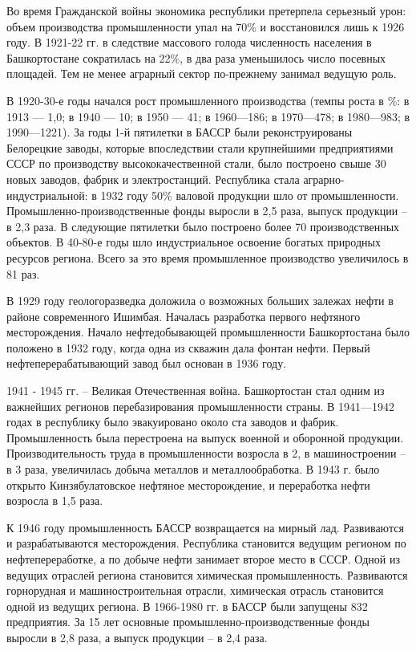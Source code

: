 Во время Гражданской войны экономика республики претерпела серьезный урон: объем производства промышленности упал на 70\% и восстановился лишь к 1926 году. В 1921-22 гг. в следствие массового голода численность населения в Башкортостане сократилась на 22\%, в два раза уменьшилось число посевных площадей. Тем не менее аграрный сектор по-прежнему занимал ведущую роль. 

В 1920-30-е годы начался рост промышленного производства (темпы роста в \%: в 1913 — 1,0; в 1940 — 10; в 1950 — 41; в 1960—186; в 1970—478; в 1980—983; в 1990—1221). За годы 1-й пятилетки в БАССР были реконструированы Белорецкие заводы, которые впоследствии стали крупнейшими предприятиями СССР по производству высококачественной стали, было построено свыше 30 новых заводов, фабрик и электростанций. Республика стала аграрно-индустриальной: в 1932 году 50\% валовой продукции шло от промышленности. Промышленно-производственные фонды выросли в 2,5 раза, выпуск продукции – в 2,3 раза. В следующие пятилетки было построено более 70 производственных объектов. В 40-80-е годы шло индустриальное освоение богатых природных ресурсов региона. Всего за это время промышленное производство увеличилось в 81 раз.

В 1929 году геологоразведка доложила о возможных больших залежах нефти в районе современного Ишимбая. Началась разработка первого нефтяного месторождения. Начало нефтедобывающей промышленности Башкортостана было положено в 1932 году,  когда одна из скважин дала фонтан нефти. Первый нефтеперерабатывающий завод был основан в 1936 году.

1941 - 1945 гг. – Великая Отечественная война. Башкортостан стал одним из важнейших регионов перебазирования промышленности страны. В 1941—1942 годах в республику было эвакуировано около ста заводов и фабрик. Промышленность была перестроена на выпуск военной и оборонной продукции. Производительность труда в промышленности возросла в 2, в машиностроении – в 3 раза, увеличилась добыча металлов и металлообработка. В 1943 г. было открыто Кинзябулатовское нефтяное месторождение, и переработка нефти возросла в 1,5 раза.

К 1946 году промышленность БАССР возвращается на мирный лад. Развиваются и разрабатываются месторождения. Республика становится ведущим регионом по нефтепереработке, а по добыче нефти занимает второе место в СССР. Одной из ведущих отраслей региона становится химическая промышленность. Развиваются горнорудная и машиностроительная отрасли, химическая отрасль становится одной из ведущих региона. В 1966-1980 гг. в БАССР были запущены 832 предприятия. За 15 лет основные промышленно-производственные фонды выросли в 2,8 раза, а выпуск продукции – в 2,4 раза. 

